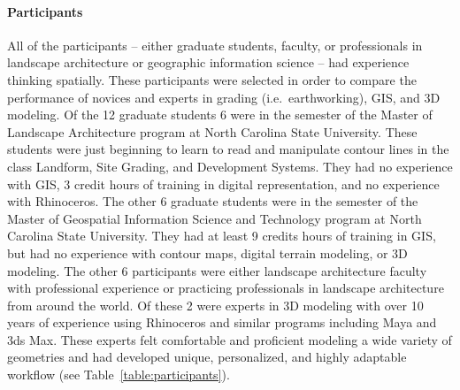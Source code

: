 \documentclass[prodmode,acmtochi]{acmsmall} %
\begin{document}

\paragraph{Participants}
All of the participants 
-- either graduate students, faculty, or professionals 
in landscape architecture or geographic information science -- 
had experience thinking spatially. 
These participants were selected in order to compare 
the performance of novices and experts
in grading (i.e.~earthworking), GIS, and 3D modeling.
Of the 12 graduate students 6 were in the  semester of the 
Master of Landscape Architecture program 
at North Carolina State University.
These students were just beginning to learn to read and manipulate contour lines 
in the class Landform, Site Grading, and Development Systems. 
They had no experience with GIS, 3 credit hours of training in digital representation, 
and no experience with Rhinoceros.
The other 6 graduate students were in the  semester of the 
Master of Geospatial Information Science and Technology program 
at North Carolina State University.
They had at least 9 credits hours of training in GIS, but 
had no experience with contour maps, digital terrain modeling, or 3D modeling.
The other 6 participants were either landscape architecture faculty 
with professional experience or practicing professionals in landscape architecture 
from around the world. 
Of these 2 were experts in 3D modeling with over 10 years of experience 
using Rhinoceros and similar programs including Maya and 3ds Max. 
These experts felt comfortable and proficient modeling a wide variety of geometries 
and had developed unique, personalized, and highly adaptable workflow 
(see Table~\ref{table:participants}).
\end{document}
